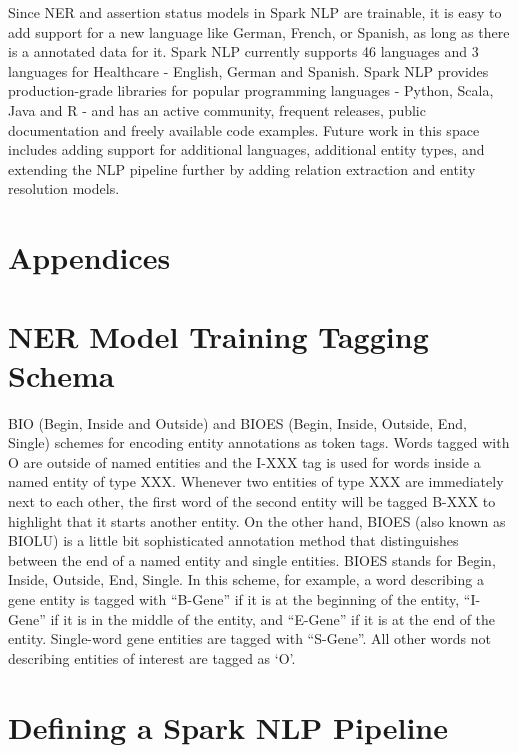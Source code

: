 \documentclass[letterpaper]{article} \usepackage{aaai21}  \usepackage{times}  \usepackage{helvet} \usepackage{courier}  \usepackage[hyphens]{url}  \usepackage{graphicx} \urlstyle{rm} \def\UrlFont{\rm}  \usepackage{natbib}  \usepackage{caption} \frenchspacing  \setlength{\pdfpagewidth}{8.5in}  \setlength{\pdfpageheight}{11in}  \usepackage{lscape}
\begin{document}
Since NER and assertion status models in Spark NLP are trainable, it is easy to add support for a new language like German, French, or Spanish, as long as there is a annotated data for it. Spark NLP currently supports 46 languages and 3 languages for Healthcare - English, German and Spanish. Spark NLP provides production-grade libraries for popular programming languages - Python, Scala, Java and R - and has an active community, frequent releases, public documentation and freely available code examples. Future work in this space includes adding support for additional languages, additional entity types, and extending the NLP pipeline further by adding relation extraction and entity resolution models.



\appendix

\newpage

\section*{Appendices}
\label{sec:appendix}

\section{NER Model Training Tagging Schema}
\label{appendix:tagging}

BIO (Begin, Inside and Outside) and BIOES (Begin, Inside, Outside, End, Single) schemes for encoding entity annotations as token tags. Words tagged with O are outside of named entities and the I-XXX tag is used for words inside a named entity of type XXX. Whenever two entities of type XXX are immediately next to each other, the first word of the second entity will be tagged B-XXX to highlight that it starts another entity. On the other hand, BIOES (also known as BIOLU) is a little bit sophisticated annotation method that distinguishes between the end of a named entity and single entities. BIOES stands for Begin, Inside, Outside, End, Single. In this scheme, for example, a word describing a gene entity is tagged with “B-Gene” if it is at the beginning of the entity, “I-Gene” if it is in the middle of the entity, and “E-Gene” if it is at the end of the entity. Single-word gene entities are tagged with “S-Gene”. All other words not describing entities of interest are tagged as ‘O’. 


\section{Defining a Spark NLP Pipeline}
\label{appendix:python_code_pipeline}
\end{document}
